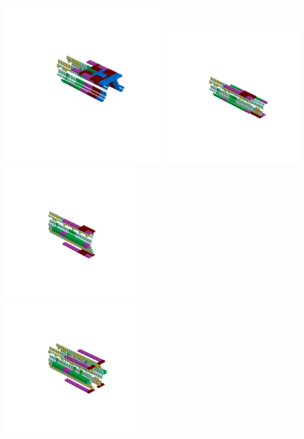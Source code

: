 \begin{minipage}[b]{0.48\linewidth}                                       
  \begin{figure}[H]
      \centering
        \vspace*{-1cm}
        \hspace*{-2cm}
        \includegraphics[width=6cm]{src/symmetries/pattern13_1-45.png}%
        \hspace*{-3cm}
        \includegraphics[width=5cm]{src/symmetries/pattern13_2-45.png}\\
        \vspace*{-3cm}
        \hspace*{-4cm}
        \includegraphics[width=5cm]{src/symmetries/pattern13_3-45.png} \\
        \vspace*{-5cm}
        \includegraphics[width=5cm]{src/symmetries/pattern13_4-45.png}
        \vspace*{-1cm}
  \caption*{}
  \end{figure}
\end{minipage}
